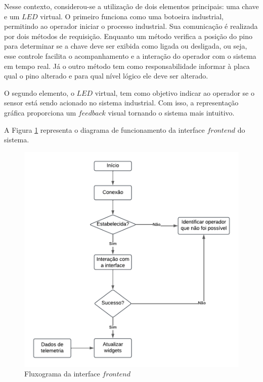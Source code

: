 \documentclass{ecatfg}
\begin{document}
Nesse contexto, considerou-se a utilização de dois elementos principais: uma chave e um $LED$ virtual. O primeiro funciona como uma botoeira industrial, permitindo ao operador iniciar o processo industrial. Sua comunicação é realizada por dois métodos de requisição. Enquanto um método verifica a posição do pino para determinar se a chave deve ser exibida como ligada ou desligada, ou seja, esse controle facilita o acompanhamento e a interação do operador com o sistema em tempo real. Já o outro método tem como responsabilidade informar à placa qual o pino alterado e para qual nível lógico ele deve ser alterado.\par

O segundo elemento, o $LED$ virtual, tem como objetivo indicar ao operador se o sensor está sendo acionado no sistema industrial. Com isso, a representação gráfica proporciona um $feedback$ visual tornando o sistema mais intuitivo. \par 

A Figura \ref{fig:5} representa o diagrama de funcionamento  da interface $frontend$ do sistema. \par  

\begin{figure}[!htb]
    \centering
    \includegraphics[scale=0.17]{Figuras/fluxograma_frontend.png}
    \caption{Fluxograma da interface $frontend$}
    \label{fig:5}
\end{figure}
\end{document}
